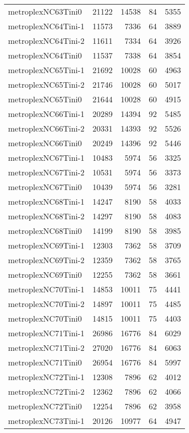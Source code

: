 \begin{longtable}{lrrrr}
metroplexNC63Tini0 & 21122 & 14538 & 84 & 5355 \\
metroplexNC64Tini-1 & 11573 & 7336 & 64 & 3889 \\
metroplexNC64Tini-2 & 11611 & 7334 & 64 & 3926 \\
metroplexNC64Tini0 & 11537 & 7338 & 64 & 3854 \\
metroplexNC65Tini-1 & 21692 & 10028 & 60 & 4963 \\
metroplexNC65Tini-2 & 21746 & 10028 & 60 & 5017 \\
metroplexNC65Tini0 & 21644 & 10028 & 60 & 4915 \\
metroplexNC66Tini-1 & 20289 & 14394 & 92 & 5485 \\
metroplexNC66Tini-2 & 20331 & 14393 & 92 & 5526 \\
metroplexNC66Tini0 & 20249 & 14396 & 92 & 5446 \\
metroplexNC67Tini-1 & 10483 & 5974 & 56 & 3325 \\
metroplexNC67Tini-2 & 10531 & 5974 & 56 & 3373 \\
metroplexNC67Tini0 & 10439 & 5974 & 56 & 3281 \\
metroplexNC68Tini-1 & 14247 & 8190 & 58 & 4033 \\
metroplexNC68Tini-2 & 14297 & 8190 & 58 & 4083 \\
metroplexNC68Tini0 & 14199 & 8190 & 58 & 3985 \\
metroplexNC69Tini-1 & 12303 & 7362 & 58 & 3709 \\
metroplexNC69Tini-2 & 12359 & 7362 & 58 & 3765 \\
metroplexNC69Tini0 & 12255 & 7362 & 58 & 3661 \\
metroplexNC70Tini-1 & 14853 & 10011 & 75 & 4441 \\
metroplexNC70Tini-2 & 14897 & 10011 & 75 & 4485 \\
metroplexNC70Tini0 & 14815 & 10011 & 75 & 4403 \\
metroplexNC71Tini-1 & 26986 & 16776 & 84 & 6029 \\
metroplexNC71Tini-2 & 27020 & 16776 & 84 & 6063 \\
metroplexNC71Tini0 & 26954 & 16776 & 84 & 5997 \\
metroplexNC72Tini-1 & 12308 & 7896 & 62 & 4012 \\
metroplexNC72Tini-2 & 12362 & 7896 & 62 & 4066 \\
metroplexNC72Tini0 & 12254 & 7896 & 62 & 3958 \\
metroplexNC73Tini-1 & 20126 & 10977 & 64 & 4947 \\

\end{longtable}
